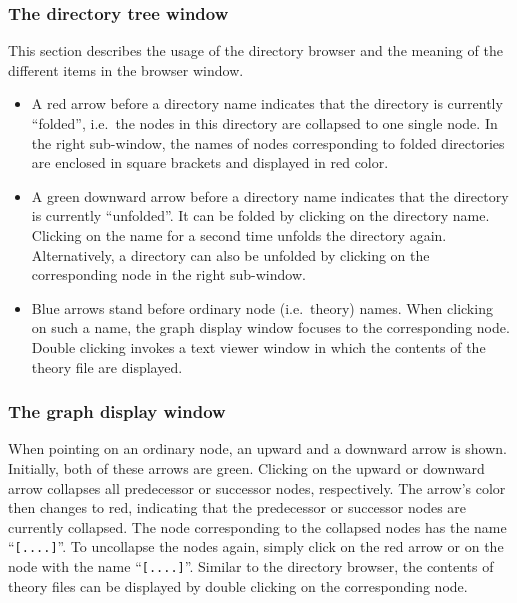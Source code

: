 \subsubsection*{The directory tree window}

This section describes the usage of the directory browser and the
meaning of the different items in the browser window.
\begin{itemize}
  
\item A red arrow before a directory name indicates that the directory
  is currently ``folded'', i.e.~the nodes in this directory are
  collapsed to one single node. In the right sub-window, the names of
  nodes corresponding to folded directories are enclosed in square
  brackets and displayed in red color.
  
\item A green downward arrow before a directory name indicates that
  the directory is currently ``unfolded''. It can be folded by
  clicking on the directory name.  Clicking on the name for a second
  time unfolds the directory again.  Alternatively, a directory can
  also be unfolded by clicking on the corresponding node in the right
  sub-window.
  
\item Blue arrows stand before ordinary node (i.e.~theory) names. When
  clicking on such a name, the graph display window focuses to the
  corresponding node. Double clicking invokes a text viewer window in
  which the contents of the theory file are displayed.

\end{itemize}


\subsubsection*{The graph display window}

When pointing on an ordinary node, an upward and a downward arrow is
shown.  Initially, both of these arrows are green. Clicking on the
upward or downward arrow collapses all predecessor or successor nodes,
respectively. The arrow's color then changes to red, indicating that
the predecessor or successor nodes are currently collapsed. The node
corresponding to the collapsed nodes has the name ``{\tt [....]}''. To
uncollapse the nodes again, simply click on the red arrow or on the
node with the name ``{\tt [....]}''. Similar to the directory browser,
the contents of theory files can be displayed by double clicking on
the corresponding node.


